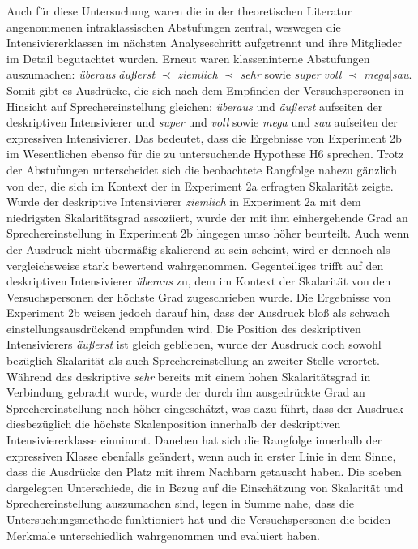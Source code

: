 Auch für diese Untersuchung waren die in der theoretischen Literatur angenommenen intraklassischen Abstufungen zentral, weswegen die Intensiviererklassen im nächsten Analyseschritt aufgetrennt und ihre Mitglieder im Detail begutachtet wurden. Erneut waren klasseninterne Abstufungen auszumachen: \textit{überaus}|\textit{äußerst} $\prec$ \textit{ziemlich} $\prec$ \textit{sehr} sowie \textit{super}|\textit{voll} $\prec$ \textit{mega}|\textit{sau}. Somit gibt es Ausdrücke, die sich nach dem Empfinden der Versuchspersonen in Hinsicht auf Sprechereinstellung gleichen: \textit{überaus} und \textit{äußerst} aufseiten der deskriptiven Intensivierer und \textit{super} und \textit{voll} sowie \textit{mega} und \textit{sau} aufseiten der expressiven Intensivierer. Das bedeutet, dass die Ergebnisse von Experiment 2b im Wesentlichen ebenso für die zu untersuchende {Hypothese H6} sprechen. Trotz der Abstufungen unterscheidet sich die beobachtete Rangfolge nahezu gänzlich von der, die sich im Kontext der in {Experiment 2a} erfragten Skalarität zeigte. Wurde der deskriptive Intensivierer \textit{ziemlich} in {Experiment 2a} mit dem niedrigsten Skalaritätsgrad assoziiert, wurde der mit ihm einhergehende Grad an Sprechereinstellung in Experiment 2b hingegen umso höher beurteilt. Auch wenn der Ausdruck nicht übermäßig skalierend zu sein scheint, wird er dennoch als vergleichsweise stark bewertend wahrgenommen. Gegenteiliges trifft auf den deskriptiven Intensivierer \textit{überaus} zu, dem im Kontext der Skalarität von den Versuchspersonen der höchste Grad zugeschrieben wurde. Die Ergebnisse von {Experiment 2b} weisen jedoch darauf hin, dass der Ausdruck bloß als schwach einstellungsausdrückend empfunden wird. Die Position des deskriptiven Intensivierers \textit{äußerst} ist gleich geblieben, wurde der Ausdruck doch sowohl bezüglich Skalarität als auch Sprechereinstellung an zweiter Stelle verortet. Während das deskriptive \textit{sehr} bereits mit einem hohen Skalaritätsgrad in Verbindung gebracht wurde, wurde der durch ihn ausgedrückte Grad an Sprechereinstellung noch höher eingeschätzt, was dazu führt, dass der Ausdruck diesbezüglich die höchste Skalenposition innerhalb der deskriptiven Intensiviererklasse einnimmt. Daneben hat sich die Rangfolge innerhalb der expressiven Klasse ebenfalls geändert, wenn auch in erster Linie in dem Sinne, dass die Ausdrücke den Platz mit ihrem Nachbarn getauscht haben. Die soeben dargelegten Unterschiede, die in Bezug auf die Einschätzung von Skalarität und Sprechereinstellung auszumachen sind, legen in Summe nahe, dass die Untersuchungsmethode funktioniert hat und die Versuchspersonen die beiden Merkmale unterschiedlich wahrgenommen und {evaluiert haben}.


